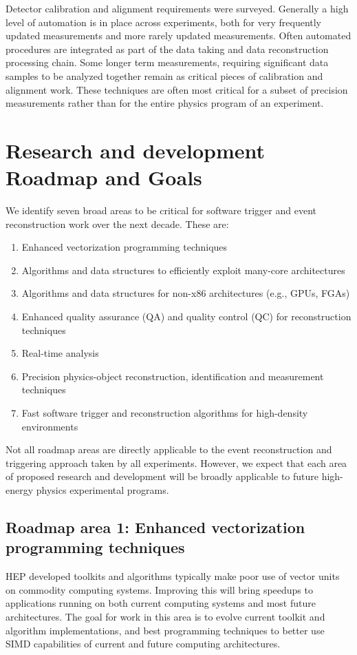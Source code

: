 Detector calibration and alignment requirements were surveyed. Generally a high level of automation is in place across experiments, both for very frequently updated measurements and more rarely updated measurements. Often automated procedures are integrated as part of the data taking and data reconstruction processing chain. Some longer term measurements, requiring significant data samples to be analyzed together remain as critical pieces of calibration and alignment work. These techniques are often most critical for a subset of precision measurements rather than for the entire physics program of an experiment.

\section{Research and development Roadmap and Goals}  

We identify seven broad areas to be critical for software trigger and event reconstruction work over the next decade. These are:
\begin{enumerate}[itemsep=-1ex]
\item
Enhanced vectorization programming techniques
\item
Algorithms and data structures to efficiently exploit many-core architectures
\item
Algorithms and data structures for non-x86 architectures (e.g., GPUs, FGAs)
\item
Enhanced quality assurance (QA) and quality control (QC) for reconstruction techniques
\item
Real-time analysis
\item
Precision physics-object reconstruction, identification and measurement techniques
\item
Fast software trigger and reconstruction algorithms for high-density environments
\end{enumerate}
Not all roadmap areas are directly applicable to the event reconstruction and triggering approach taken by all experiments. However, we expect that each area of proposed research and development will be broadly applicable to future high-energy physics experimental programs.

\subsection*{Roadmap area 1: Enhanced vectorization programming techniques} 

HEP developed toolkits and algorithms typically make poor use of vector units on commodity computing systems. Improving this will bring speedups to applications running on both current computing systems and most future architectures. The goal for work in this area is to evolve current toolkit and algorithm implementations, and best programming techniques to better use SIMD capabilities of current and future computing architectures.

